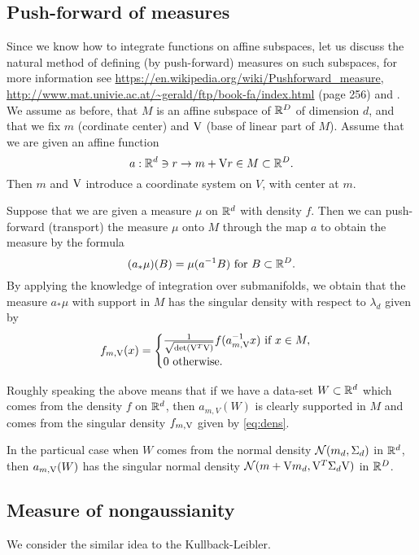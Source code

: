\subsection{Push-forward of measures}

Since we know how to integrate functions on affine subspaces, let us discuss the
natural method of defining (by push-forward) measures on such subspaces,
for more information see \url{https://en.wikipedia.org/wiki/Pushforward_measure},
\url{http://www.mat.univie.ac.at/~gerald/ftp/book-fa/index.html} (page 256) and
\cite{bogachev2007measure}. We assume as before, that 
$M$ is an affine subspace of $\mathbb{R}^D$ of dimension $d$, and that we fix $m$ (cordinate center) and $\mathrm{V}$ (base of linear part of $M$).
Assume that we are given an affine function
$$
a: \mathbb{R}^d \ni r \to m+\mathrm{V} r \in M \subset \mathbb{R}^D.
$$
Then $m$ and $\mathrm{V}$ introduce a coordinate system on $V$, with center at $m$. 

Suppose that we are given a measure $\mu$ on $\mathbb{R}^d$ with density $f$. Then
we can push-forward (transport) the measure $\mu$ onto $M$ through the map $a$ to obtain the measure by the formula
$$
(a_* \mu)(B)=\mu(a^{-1}B) \text{ for } B \subset \mathbb{R}^D.
$$
By applying the knowledge of integration over submanifolds, we obtain that 
the measure $a_* \mu$ with support in $M$ has the singular density with respect to $\lambda_d$ given by
\begin{equation} \label{eq:dens}
f_{m,\mathrm{V}}(x)= 
\begin{cases}
\frac{1}{\sqrt{\det(\mathrm{V}^T\mathrm{V})}}
 f(a_{m,\mathrm{V}}^{-1}x) \text{ if } x \in M, \\
 0 \text{ otherwise}.
 \end{cases}
\end{equation}

Roughly speaking the above means that if we have a data-set $W \subset \mathbb{R}^d$ which comes from the density $f$ on $\mathbb{R}^d$, then $a_{m,V}(W)$ is clearly supported in $M$ and comes from the singular density $f_{m,\mathrm{V}}$ given by 
\eqref{eq:dens}.

In the particual case when $W$ comes from the normal density $\mathcal{N}(m_d,\Sigma_d)$ in $\mathbb{R}^d$, then $a_{m,\mathrm{V}}(W)$ has the singular normal density $\mathcal{N}(m+\mathrm{V} m_d,\mathrm{V}^T \Sigma_d \mathrm{V} )$ in $\mathbb{R}^D$.


\subsection{Measure of nongaussianity}

We consider the similar idea to the Kullback-Leibler.

